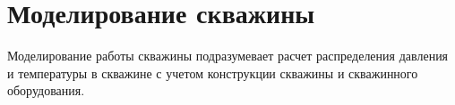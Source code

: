\section{Моделирование скважины}
Моделирование работы скважины подразумевает расчет распределения давления и температуры в скважине с учетом конструкции скважины и скважинного оборудования. 





